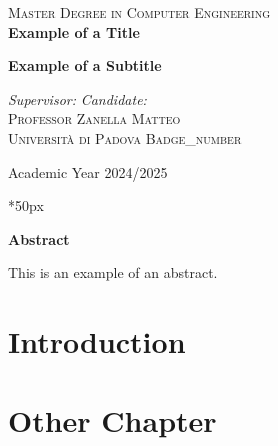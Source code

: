 \documentclass[a4paper,twoside,12pt]{report}
\newcommand\blankpage{%
    \null
    \thispagestyle{empty}%
    \addtocounter{page}{-1}%
    \newpage}
\begin{document}
\begin{titlepage}
\begin{center}
        \textsc{\large Master Degree in Computer Engineering}\\
        \vfill
        { \LARGE \bfseries Example of a Title}\\
        \vspace{1cm}

        \textbf{\large Example of a Subtitle}\\
        \vfill

        \textit{\large Supervisor:} \hfill \textit{\large Candidate:}\\
        \textsc{\large Professor} \hfill \textsc{Zanella Matteo}\\
        \textsc{Università di Padova} \hfill \textsc{Badge\_number}\\

        \vfill

        Academic Year 2024/2025

        \vfill

    \end{center}
\end{titlepage}

\thispagestyle{empty}
\clearpage{\pagestyle{plain}\cleardoublepage}
    
\clearpage\null\newpage

\newcommand\summaryname{Abstract}
\newenvironment{Abstract} {
    \begin{center}%
    \bfseries{\summaryname} \end{center}
}

\vspace*{50px}

\begin{Abstract}
    \begin{center}
        This is an example of an abstract.
    \end{center}
\end{Abstract}

\afterpage{\blankpage}

\clearpage{\pagestyle{plain}\cleardoublepage}
\tableofcontents

\clearpage{\pagestyle{plain}\cleardoublepage}

\clearpage{\pagestyle{plain}\cleardoublepage}
\chapter{Introduction}


\clearpage{\pagestyle{plain}\cleardoublepage}
\chapter{Other Chapter}


\afterpage{\blankpage}
    
\printbibliography
\end{document}
